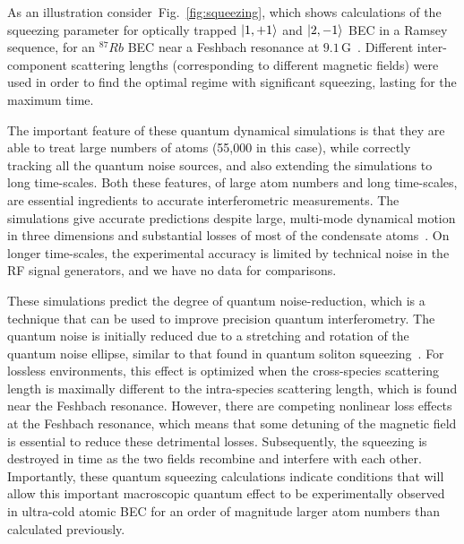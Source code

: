 \documentclass[aps,prl,twocolumn,showpacs,amsmath,amssymb,superscriptaddress,flushbottom,noraggedfooter]{revtex4-1}
\newcommand{\figref}[1]{Fig.~\ref{#1}}
\newcommand{\ket}[1]{\mbox{\ensuremath{\vert #1 \rangle}}}
\begin{document}
As an illustration consider~\figref{fig:squeezing}, which shows calculations of the squeezing parameter
for optically trapped $\ket{1,+1}$ and $\ket{2,-1}$ BEC in a Ramsey sequence, for an $^{87}Rb$ BEC near a Feshbach resonance at $9.1\,\mathrm{G}$~\cite{Kaufman2009}.
Different inter-component scattering lengths (corresponding to different magnetic fields) were used in order to find the optimal regime
with significant squeezing, lasting for the maximum time.

The important feature of these quantum dynamical simulations
is that they are able to treat large numbers of atoms (55,000 in this case),
while correctly tracking all the quantum noise sources, and also extending the simulations to long time-scales.
Both these features, of large atom numbers and long time-scales,
are essential ingredients to accurate interferometric measurements.
The simulations give accurate predictions despite large, multi-mode dynamical motion in three dimensions
and substantial losses of most of the condensate atoms~\cite{Egorov2011}.
On longer time-scales, the experimental accuracy is limited by technical noise in the RF signal generators,
and we have no data for comparisons.

These simulations predict the degree of quantum noise-reduction, which
is a technique that can be used to improve precision quantum interferometry.
The quantum noise is initially reduced due to a stretching and rotation
of the quantum noise ellipse, similar to that found in quantum soliton
squeezing~\cite{Carter1987,Drummond1993a}.
For lossless environments, this effect is optimized when the cross-species
scattering length is maximally different to the intra-species scattering
length, which is found near the Feshbach resonance.
However, there are competing nonlinear loss effects at the Feshbach resonance,
which means that some detuning of the magnetic field is essential to reduce
these detrimental losses.
Subsequently, the squeezing is destroyed in time as the two fields recombine
and interfere with each other.
Importantly, these quantum squeezing calculations indicate conditions that
will allow this important macroscopic quantum effect to be experimentally
observed in ultra-cold atomic BEC for an order of magnitude larger atom
numbers than calculated previously.
\end{document}
